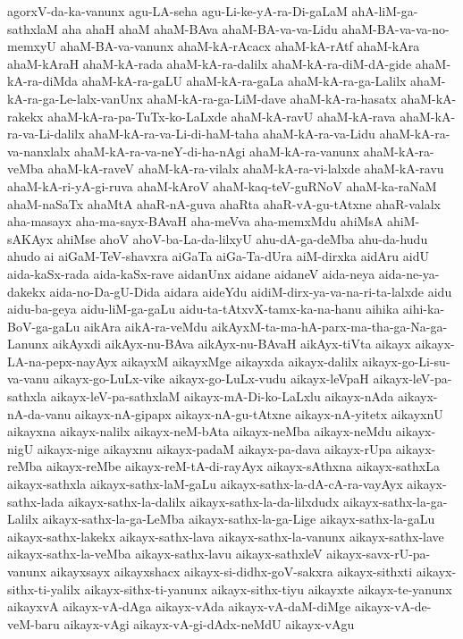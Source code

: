 {agorxV-da-ka-vanunx
agu-LA-seha
agu-Li-ke-yA-ra-Di-gaLaM
ahA-liM-ga-sathxlaM
aha
ahaH
ahaM
ahaM-BAva
ahaM-BA-va-va-Lidu
ahaM-BA-va-va-no-memxyU
ahaM-BA-va-vanunx
ahaM-kA-rAcacx
ahaM-kA-rAtf
ahaM-kAra
ahaM-kAraH
ahaM-kA-rada
ahaM-kA-ra-dalilx
ahaM-kA-ra-diM-dA-gide
ahaM-kA-ra-diMda
ahaM-kA-ra-gaLU
ahaM-kA-ra-gaLa
ahaM-kA-ra-ga-Lalilx
ahaM-kA-ra-ga-Le-lalx-vanUnx
ahaM-kA-ra-ga-LiM-dave
ahaM-kA-ra-hasatx
ahaM-kA-rakekx
ahaM-kA-ra-pa-TuTx-ko-LaLxde
ahaM-kA-ravU
ahaM-kA-rava
ahaM-kA-ra-va-Li-dalilx
ahaM-kA-ra-va-Li-di-haM-taha
ahaM-kA-ra-va-Lidu
ahaM-kA-ra-va-nanxlalx
ahaM-kA-ra-va-neY-di-ha-nAgi
ahaM-kA-ra-vanunx
ahaM-kA-ra-veMba
ahaM-kA-raveV
ahaM-kA-ra-vilalx
ahaM-kA-ra-vi-lalxde
ahaM-kA-ravu
ahaM-kA-ri-yA-gi-ruva
ahaM-kAroV
ahaM-kaq-teV-guRNoV
ahaM-ka-raNaM
ahaM-naSaTx
ahaMtA
ahaR-nA-guva
ahaRta
ahaR-vA-gu-tAtxne
ahaR-valalx
aha-masayx
aha-ma-sayx-BAvaH
aha-meVva
aha-memxMdu
ahiMsA
ahiM-sAKAyx
ahiMse
ahoV
ahoV-ba-La-da-lilxyU
ahu-dA-ga-deMba
ahu-da-hudu
ahudo
ai
aiGaM-TeV-shavxra
aiGaTa
aiGa-Ta-dUra
aiM-dirxka
aidAru
aidU
aida-kaSx-rada
aida-kaSx-rave
aidanUnx
aidane
aidaneV
aida-neya
aida-ne-ya-dakekx
aida-no-Da-gU-Dida
aidara
aideYdu
aidiM-dirx-ya-va-na-ri-ta-lalxde
aidu
aidu-ba-geya
aidu-liM-ga-gaLu
aidu-ta-tAtxvX-tamx-ka-na-hanu
aihika
aihi-ka-BoV-ga-gaLu
aikAra
aikA-ra-veMdu
aikAyxM-ta-ma-hA-parx-ma-tha-ga-Na-ga-Lanunx
aikAyxdi
aikAyx-nu-BAva
aikAyx-nu-BAvaH
aikAyx-tiVta
aikayx
aikayx-LA-na-pepx-nayAyx
aikayxM
aikayxMge
aikayxda
aikayx-dalilx
aikayx-go-Li-su-va-vanu
aikayx-go-LuLx-vike
aikayx-go-LuLx-vudu
aikayx-leVpaH
aikayx-leV-pa-sathxla
aikayx-leV-pa-sathxlaM
aikayx-mA-Di-ko-LaLxlu
aikayx-nAda
aikayx-nA-da-vanu
aikayx-nA-gipapx
aikayx-nA-gu-tAtxne
aikayx-nA-yitetx
aikayxnU
aikayxna
aikayx-nalilx
aikayx-neM-bAta
aikayx-neMba
aikayx-neMdu
aikayx-nigU
aikayx-nige
aikayxnu
aikayx-padaM
aikayx-pa-dava
aikayx-rUpa
aikayx-reMba
aikayx-reMbe
aikayx-reM-tA-di-rayAyx
aikayx-sAthxna
aikayx-sathxLa
aikayx-sathxla
aikayx-sathx-laM-gaLu
aikayx-sathx-la-dA-cA-ra-vayAyx
aikayx-sathx-lada
aikayx-sathx-la-dalilx
aikayx-sathx-la-da-lilxdudx
aikayx-sathx-la-ga-Lalilx
aikayx-sathx-la-ga-LeMba
aikayx-sathx-la-ga-Lige
aikayx-sathx-la-gaLu
aikayx-sathx-lakekx
aikayx-sathx-lava
aikayx-sathx-la-vanunx
aikayx-sathx-lave
aikayx-sathx-la-veMba
aikayx-sathx-lavu
aikayx-sathxleV
aikayx-savx-rU-pa-vanunx
aikayxsayx
aikayxshacx
aikayx-si-didhx-goV-sakxra
aikayx-sithxti
aikayx-sithx-ti-yalilx
aikayx-sithx-ti-yanunx
aikayx-sithx-tiyu
aikayxte
aikayx-te-yanunx
aikayxvA
aikayx-vA-dAga
aikayx-vAda
aikayx-vA-daM-diMge
aikayx-vA-de-veM-baru
aikayx-vAgi
aikayx-vA-gi-dAdx-neMdU
aikayx-vAgu
}
